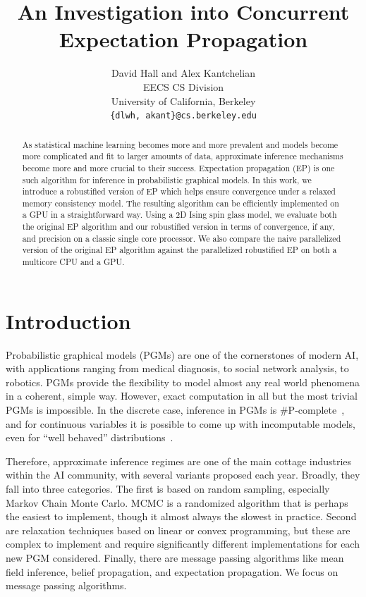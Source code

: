 \documentclass[times, 10pt,twocolumn]{article}
\begin{document}
\title{An Investigation into Concurrent Expectation Propagation}

\author{David Hall and Alex Kantchelian \\
EECS CS Division \\ University of California, Berkeley\\ \texttt{\{dlwh,
akant\}@cs.berkeley.edu}\\
}

\maketitle
\thispagestyle{empty}

\begin{abstract}
As statistical machine learning becomes more and more prevalent and models become more complicated and fit to larger amounts of data, approximate inference mechanisms become more and more crucial to their success. Expectation propagation (EP) is one such algorithm for inference in probabilistic graphical models. In this work, we introduce a robustified version of EP which helps ensure convergence under a relaxed memory consistency model. The resulting algorithm can be efficiently implemented on a GPU in a straightforward way. Using a 2D Ising spin glass model, we evaluate both the original EP algorithm and our robustified version in terms of convergence, if any, and precision on a classic single core processor. We also compare the naive parallelized version of the original EP algorithm against the parallelized robustified EP on both a multicore CPU and a GPU.
\end{abstract}



\section{Introduction}

Probabilistic graphical models (PGMs) are one of the cornerstones
of modern AI, with applications ranging from medical diagnosis, to
social network analysis, to robotics. PGMs provide the flexibility
to model almost any real world phenomena in a coherent, simple way.
However, exact computation in all but the most trivial PGMs is
impossible. In the discrete case, inference in PGMs is
\#P-complete~\cite{Koller2009pgm}, and for continuous variables it is
possible to come up with incomputable models, even for ``well
behaved'' distributions~\cite{AFR11}.

Therefore, approximate inference regimes are one of the main cottage
industries within the AI community, with several variants proposed
each year. Broadly, they fall into three categories. The first is
based on random sampling, especially Markov Chain Monte Carlo. MCMC
is a randomized algorithm that is perhaps the easiest to implement,
though it almost always the slowest in practice. Second are relaxation
techniques based on linear or convex programming, but these are
complex to implement and require significantly different implementations
for each new PGM considered. Finally, there are message passing
algorithms like mean field inference, belief propagation, and
expectation propagation.  We focus on message passing algorithms.
\end{document}
